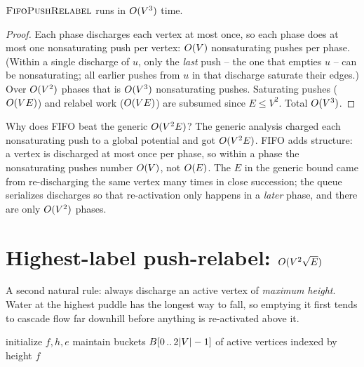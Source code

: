 \begin{theorem}
\label{ch13:thm-fifo}
$\textsc{FifoPushRelabel}$ runs in $O(V^3)$ time.
\end{theorem}

\begin{proof}
Each phase discharges each vertex at most once, so each phase does at most one nonsaturating push per vertex: $O(V)$ nonsaturating pushes per phase. (Within a single discharge of $u$, only the \emph{last} push -- the one that empties $u$ -- can be nonsaturating; all earlier pushes from $u$ in that discharge saturate their edges.) Over $O(V^2)$ phases that is $O(V^3)$ nonsaturating pushes. Saturating pushes ($O(VE)$) and relabel work ($O(VE)$) are subsumed since $E\le V^2$. Total $O(V^3)$.
\end{proof}

\begin{whybox}
Why does FIFO beat the generic $O(V^2E)$? The generic analysis charged each nonsaturating push to a global potential and got $O(V^2E)$. FIFO adds structure: a vertex is discharged at most once per phase, so within a phase the nonsaturating pushes number $O(V)$, not $O(E)$. The $E$ in the generic bound came from re-discharging the same vertex many times in close succession; the queue serializes discharges so that re-activation only happens in a \emph{later} phase, and there are only $O(V^2)$ phases.
\end{whybox}

\section{Highest-label push-relabel: \texorpdfstring{$O(V^2\sqrt{E})$}{O(V\^2 sqrt E)}}
\label{ch13:highest}

A second natural rule: always discharge an active vertex of \emph{maximum height}. Water at the highest puddle has the longest way to fall, so emptying it first tends to cascade flow far downhill before anything is re-activated above it.

\begin{algorithm}[H]
\caption{$\textsc{HighestLabelPushRelabel}(G,s,t)$}
\label{ch13:alg-highest}
\DontPrintSemicolon
initialize $f,h,e$\;
maintain buckets $B[0\,..\,2\lvert V\rvert-1]$ of active vertices indexed by height\;
\Return $f$\;
\end{algorithm}

